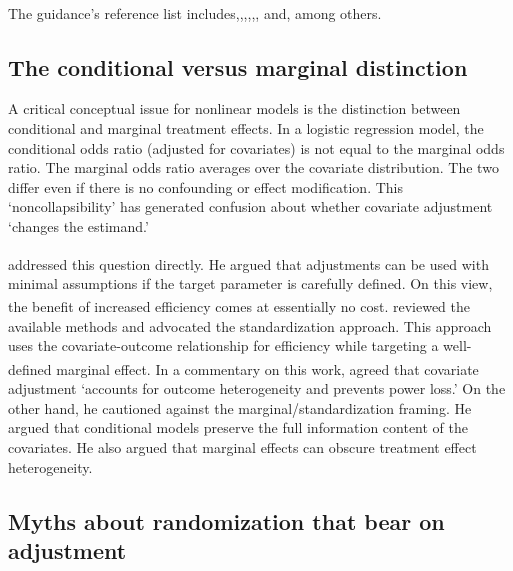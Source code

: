 \documentclass[
  11pt,
]{article}
\begin{document}
The guidance's reference list includes\textsuperscript{},\textsuperscript{},\textsuperscript{},\textsuperscript{},\textsuperscript{},\textsuperscript{}, and\textsuperscript{}, among others.

\subsection{The conditional versus marginal distinction}\label{the-conditional-versus-marginal-distinction}

A critical conceptual issue for nonlinear models is
the distinction between conditional and marginal
treatment effects. In a logistic regression model, the
conditional odds ratio (adjusted for covariates) is not
equal to the marginal odds ratio. The marginal odds
ratio averages over the covariate distribution. The two
differ even if there is no confounding or effect
modification. This `noncollapsibility' has generated
confusion about whether covariate adjustment `changes
the estimand.'

\textsuperscript{} addressed this question
directly. He argued that adjustments can be used with
minimal assumptions if the target parameter is
carefully defined. On this view, the benefit of
increased efficiency comes at essentially no cost.\textsuperscript{} reviewed the available methods
and advocated the standardization approach. This
approach uses the covariate-outcome relationship for
efficiency while targeting a well-defined marginal
effect. In a commentary on this work,\textsuperscript{} agreed that covariate adjustment
`accounts for outcome heterogeneity and prevents power
loss.' On the other hand, he cautioned against the
marginal/standardization framing. He argued that
conditional models preserve the full information
content of the covariates. He also argued that marginal
effects can obscure treatment effect heterogeneity.

\subsection{Myths about randomization that bear on adjustment}\label{myths-about-randomization-that-bear-on-adjustment}
\end{document}
